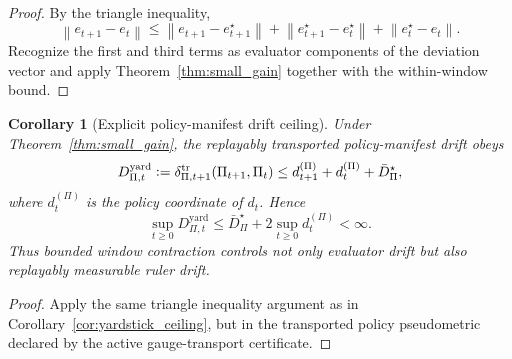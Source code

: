 \documentclass[11pt]{article}
\newtheorem{corollary}[theorem]{Corollary}
\theoremstyle{definition}
\newcommand{\1}{\mathbf{1}}
\newcommand{\norm}[1]{\left\lVert #1 \right\rVert}
\newcommand{\Defeq}{\vcentcolon=}
\begin{document}
\begin{proof}
By the triangle inequality,
\[
\norm{e_{t+1}-e_t}
\le
\norm{e_{t+1}-e_{t+1}^\star}+\norm{e_{t+1}^\star-e_t^\star}+\norm{e_t^\star-e_t}.
\]
Recognize the first and third terms as evaluator components of the deviation vector and apply Theorem~\ref{thm:small_gain} together with the within-window bound.
\end{proof}

\begin{corollary}[Explicit policy-manifest drift ceiling]\label{cor:policy_ceiling}
Under Theorem~\ref{thm:small_gain}, the replayably transported policy-manifest drift obeys
\[
D_{\Pi,t}^{\mathrm{yard}}
\Defeq
\delta_{\Pi,t+1}^{\mathrm{tr}}(\Pi_{t+1},\Pi_t)
\le d_{t+1}^{(\Pi)} + d_t^{(\Pi)} + \bar D_\Pi^\star,
\]
where $d_t^{(\Pi)}$ is the policy coordinate of $d_t$. Hence
\[
\sup_{t\ge 0} D_{\Pi,t}^{\mathrm{yard}}
\le
\bar D_\Pi^\star + 2\sup_{t\ge0} d_t^{(\Pi)}<\infty.
\]
Thus bounded window contraction controls not only evaluator drift but also replayably measurable ruler drift.
\end{corollary}

\begin{proof}
Apply the same triangle inequality argument as in Corollary~\ref{cor:yardstick_ceiling}, but in the transported policy pseudometric declared by the active gauge-transport certificate.
\end{proof}
\end{document}
